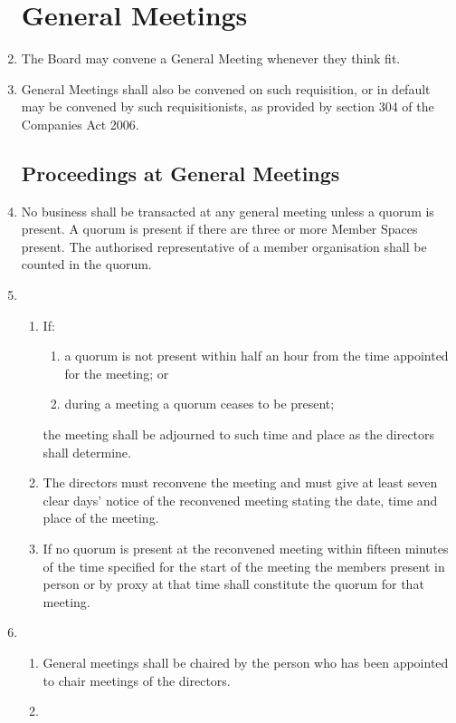 \begin{enumerate}
\section{General Meetings}
\item
    The Board may convene a General Meeting whenever they think fit.
\item
    General Meetings shall also be convened on such requisition, or in default
    may be convened by such requisitionists, as provided by section 304 of the
    Companies Act 2006.

\subsection{Proceedings at General Meetings}

\item
    No business shall be transacted at any general meeting unless a
    quorum is present. A quorum is present if there are three or more
    Member Spaces present. The authorised representative of a member organisation shall be
    counted in the quorum.
\item
  \begin{enumerate}
  \item
    If:
    \begin{enumerate}
    \item
      a quorum is not present within half an hour from the time appointed
      for the meeting; or
    \item
      during a meeting a quorum ceases to be present;
    \end{enumerate}
      the meeting shall be adjourned to such time and place as the directors shall
      determine.
  \item
    The directors must reconvene the meeting and must give at least
    seven clear days' notice of the reconvened meeting stating the
    date, time and place of the meeting.
  \item
    If no quorum is present at the reconvened meeting within fifteen
    minutes of the time specified for the start of the meeting the
    members present in person or by proxy at that time shall constitute
    the quorum for that meeting.
  \end{enumerate}
\item
  \begin{enumerate}
  \item
    General meetings shall be chaired by the person who has been
    appointed to chair meetings of the directors.
  \item

\end{enumerate}
\end{enumerate}
